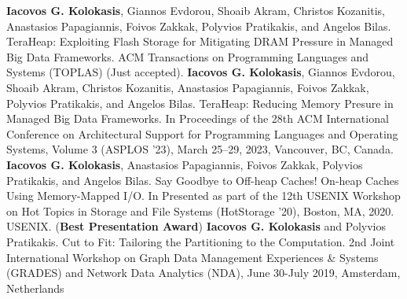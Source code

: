 



\begin{cventries}
  \cventry
    {}
    {}
    {}
    {}
	{\textbf{Iacovos G. Kolokasis}, Giannos Evdorou, Shoaib Akram,
	Christos Kozanitis, Anastasios Papagiannis, Foivos Zakkak, 
  Polyvios Pratikakis, and Angelos Bilas. TeraHeap: Exploiting Flash Storage for
Mitigating DRAM Pressure in Managed Big Data Frameworks. ACM Transactions on
Programming Languages and Systems (TOPLAS) (Just accepted).}
  {}
  \cventry
    {}
    {}
    {}
    {}
	{\textbf{Iacovos G. Kolokasis}, Giannos Evdorou, Shoaib Akram,
	Christos Kozanitis, Anastasios Papagiannis, Foivos Zakkak, 
	Polyvios Pratikakis, and Angelos Bilas. TeraHeap: Reducing Memory
  Presure in Managed Big Data Frameworks. In Proceedings of the 28th
  ACM International Conference on Architectural Support for
  Programming Languages and Operating Systems, Volume 3 (ASPLOS ’23),
  March 25–29, 2023, Vancouver, BC, Canada.}
  {}
  \cventry
    {}
    {}
    {}
    {}
    {\textbf{Iacovos G. Kolokasis}, Anastasios Papagiannis, Foivos
    Zakkak, Polyvios Pratikakis, and Angelos Bilas.%
    Say Goodbye to Off-heap Caches! On-heap Caches Using Memory-Mapped
    I/O. In Presented as part of the 12th USENIX Workshop on Hot
    Topics in Storage and File Systems (HotStorage '20), Boston, MA,
    2020. USENIX. (\textbf{Best Presentation Award})}
  {}
  \cventry
    {}
    {}
    {}
    {}
    {\textbf{Iacovos G. Kolokasis} and Polyvios
  Pratikakis. Cut to Fit: Tailoring the Partitioning to the
  Computation. 2nd Joint International Workshop on Graph Data
  Management Experiences \& Systems (GRADES) and Network Data
  Analytics (NDA), June 30-July 2019, Amsterdam, Netherlands}
  {}

\end{cventries}

